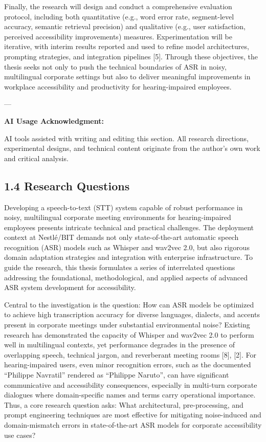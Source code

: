 \documentclass[12pt,a4paper]{article}
\begin{document}
Finally, the research will design and conduct a comprehensive evaluation protocol, including both quantitative (e.g., word error rate, segment-level accuracy, semantic retrieval precision) and qualitative (e.g., user satisfaction, perceived accessibility improvements) measures. Experimentation will be iterative, with interim results reported and used to refine model architectures, prompting strategies, and integration pipelines [5]. Through these objectives, the thesis seeks not only to push the technical boundaries of ASR in noisy, multilingual corporate settings but also to deliver meaningful improvements in workplace accessibility and productivity for hearing-impaired employees.


---


\textbf{AI Usage Acknowledgment:}

AI tools assisted with writing and editing this section. All research directions, experimental designs, and technical content originate from the author’s own work and critical analysis.


\subsection{1.4 Research Questions}


Developing a speech-to-text (STT) system capable of robust performance in noisy, multilingual corporate meeting environments for hearing-impaired employees presents intricate technical and practical challenges. The deployment context at Nestlé/BIT demands not only state-of-the-art automatic speech recognition (ASR) models such as Whisper and wav2vec 2.0, but also rigorous domain adaptation strategies and integration with enterprise infrastructure. To guide the research, this thesis formulates a series of interrelated questions addressing the foundational, methodological, and applied aspects of advanced ASR system development for accessibility.


Central to the investigation is the question: How can ASR models be optimized to achieve high transcription accuracy for diverse languages, dialects, and accents present in corporate meetings under substantial environmental noise? Existing research has demonstrated the capacity of Whisper and wav2vec 2.0 to perform well in multilingual contexts, yet performance degrades in the presence of overlapping speech, technical jargon, and reverberant meeting rooms [8], [2]. For hearing-impaired users, even minor recognition errors, such as the documented “Philippe Navratil” rendered as “Philippe Naruto”, can have significant communicative and accessibility consequences, especially in multi-turn corporate dialogues where domain-specific names and terms carry operational importance. Thus, a core research question asks: What architectural, pre-processing, and prompt engineering techniques are most effective for mitigating noise-induced and domain-mismatch errors in state-of-the-art ASR models for corporate accessibility use cases?
\end{document}
